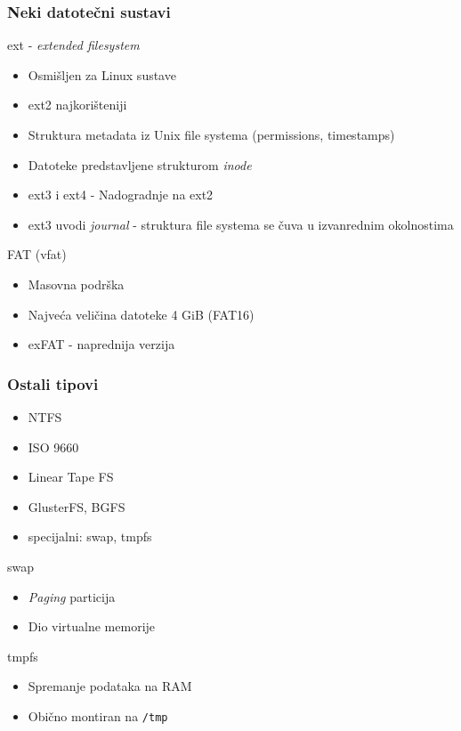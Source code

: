 \documentclass[t]{beamer}
\begin{document}
\begin{frame}
	\frametitle{Neki datotečni sustavi}
	ext - \emph{extended filesystem}
	\begin{itemize}
		\item Osmišljen za Linux sustave
		\item ext2 najkorišteniji
		\item Struktura metadata iz Unix file systema (permissions, timestamps)
		\item Datoteke predstavljene strukturom \emph{inode}
		\item ext3 i ext4 - Nadogradnje na ext2
		\item ext3 uvodi \emph{journal} - struktura file systema se čuva u izvanrednim okolnostima
	\end{itemize}
	FAT (vfat)\
	\begin{itemize}
		\item Masovna podrška
		\item Najveća veličina datoteke 4 GiB (FAT16)
		\item exFAT - naprednija verzija
	\end{itemize}
\end{frame}

\begin{frame}
	\frametitle{Ostali tipovi}
    \begin{itemize}
        \item NTFS
        \item ISO 9660
        \item Linear Tape FS
        \item GlusterFS, BGFS
        \item specijalni: swap, tmpfs
    \end{itemize}

    swap
	\begin{itemize}
		\item \emph{Paging} particija
		\item Dio virtualne memorije
	\end{itemize}
	tmpfs
	\begin{itemize}
		\item Spremanje podataka na RAM
		\item Obično montiran na \texttt{/tmp}
	\end{itemize}
\end{frame}
\end{document}
